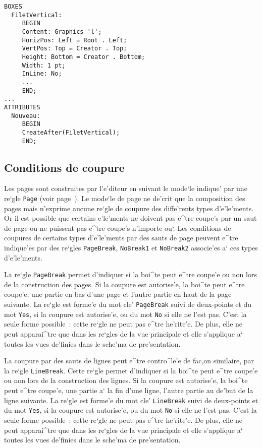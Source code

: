 {\begin{example}
\begin{verbatim}
BOXES
  FiletVertical:
     BEGIN
     Content: Graphics 'l';
     HorizPos: Left = Root . Left;
     VertPos: Top = Creator . Top;
     Height: Bottom = Creator . Bottom;
     Width: 1 pt;
     InLine: No;
     ...
     END;
...
ATTRIBUTES
  Nouveau:
     BEGIN
     CreateAfter(FiletVertical);
     END;
\end{verbatim}
\end{example}

\subsection{Conditions de coupure}
\label{condcoupure}

Les pages sont construites par l'e'diteur en suivant le mode`le indique'
par une re`gle {\tt Page} (voir page~\pageref{page}). Le mode`le de page
ne de'crit que la composition des pages mais n'exprime aucune re`gle de
coupure des diffe'rents types d'e'le'ments. Or il est possible que certains
e'le'ments ne doivent pas e^tre coupe's par un saut de page ou ne puissent
pas e^tre coupe's n'importe ou`. Les conditions de coupures de certains
types d'e'le'ments par des sauts de page peuvent e^tre indique'es par des
re`gles {\tt PageBreak}, {\tt NoBreak1} et {\tt NoBreak2} associe'es a` ces
types d'e'le'ments.

La re`gle {\tt PageBreak} permet d'indiquer si la boi^te peut e^tre coupe'e
ou non lors de la construction des pages. Si la coupure est autorise'e,
la boi^te peut e^tre coupe'e, une partie en bas d'une page et l'autre partie
en haut de la page suivante. La re`gle est forme'e du mot cle'
{\tt PageBreak} suivi de deux-points et du mot {\tt Yes}, si la coupure est
autorise'e, ou du mot {\tt No} si elle ne l'est pas. C'est la seule forme
possible~: cette re`gle ne peut pas e^tre he'rite'e. De plus, elle ne peut
apparai^tre que dans les re`gles de la vue principale et elle s'applique a`
toutes les vues de'finies dans le sche'ma de pre'sentation.

La coupure par des sauts de lignes peut e^tre contro^le'e de fac,on
similaire, par la re`gle {\tt LineBreak}. Cette re`gle permet d'indiquer si
la boi^te peut e^tre coupe'e ou non lors de la construction des lignes.
Si la coupure est autorise'e, la boi^te peut e^tre coupe'e, une partie a`
la fin d'une ligne, l'autre partie au de'but de la ligne suivante.
La re`gle est forme'e du mot cle' {\tt LineBreak} suivi de deux-points et
du mot {\tt Yes}, si la coupure est autorise'e, ou du mot {\tt No} si elle
ne l'est pas. C'est la seule forme possible~: cette re`gle ne peut pas e^tre
he'rite'e. De plus, elle ne peut apparai^tre que dans les re`gles de la vue
principale et elle s'applique a` toutes les vues de'finies dans le sche'ma
de pre'sentation.

}

